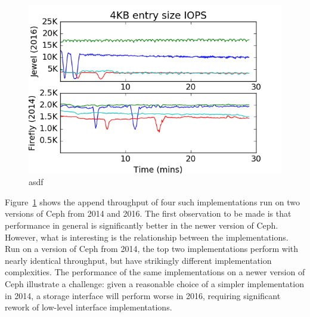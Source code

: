 \begin{figure}[t]
\centering
\includegraphics[width=1.0\linewidth]{jewel_v_firefly_pd.png}
\caption{asdf}
\label{fig:phy-design}
\end{figure}

Figure~\ref{fig:phy-design} shows the append throughput of four such
implementations run on two versions of Ceph from 2014 and 2016. The first
observation to be made is that performance in general is significantly better
in the newer version of Ceph. However, what is interesting is the relationship
between the implementations. Run on a version of Ceph from 2014, the top two
implementations perform with nearly identical throughput, but have strikingly
different implementation complexities. The performance of the same
implementations on a newer version of Ceph illustrate a challenge: given a
reasonable choice of a simpler implementation in 2014, a storage interface
will perform worse in 2016, requiring significant rework of low-level
interface implementations.
